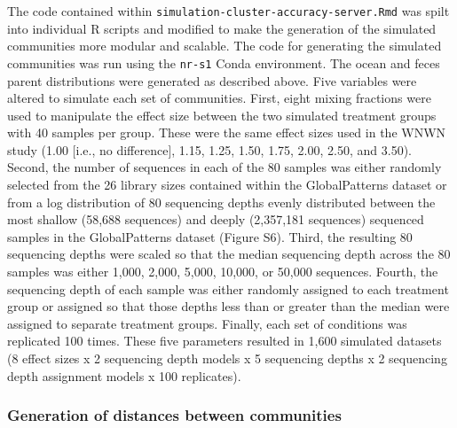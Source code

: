 \documentclass[
]{article}
\begin{document}
The code contained within
\texttt{simulation-cluster-accuracy-server.Rmd} was spilt into
individual R scripts and modified to make the generation of the
simulated communities more modular and scalable. The code for generating
the simulated communities was run using the \texttt{nr-s1} Conda
environment. The ocean and feces parent distributions were generated as
described above. Five variables were altered to simulate each set of
communities. First, eight mixing fractions were used to manipulate the
effect size between the two simulated treatment groups with 40 samples
per group. These were the same effect sizes used in the WNWN study (1.00
{[}i.e., no difference{]}, 1.15, 1.25, 1.50, 1.75, 2.00, 2.50, and
3.50). Second, the number of sequences in each of the 80 samples was
either randomly selected from the 26 library sizes contained within the
GlobalPatterns dataset or from a log distribution of 80 sequencing
depths evenly distributed between the most shallow (58,688 sequences)
and deeply (2,357,181 sequences) sequenced samples in the GlobalPatterns
dataset (Figure S6). Third, the resulting 80 sequencing depths were
scaled so that the median sequencing depth across the 80 samples was
either 1,000, 2,000, 5,000, 10,000, or 50,000 sequences. Fourth, the
sequencing depth of each sample was either randomly assigned to each
treatment group or assigned so that those depths less than or greater
than the median were assigned to separate treatment groups. Finally,
each set of conditions was replicated 100 times. These five parameters
resulted in 1,600 simulated datasets (8 effect sizes x 2 sequencing
depth models x 5 sequencing depths x 2 sequencing depth assignment
models x 100 replicates).

\hypertarget{generation-of-distances-between-communities}{%
\subsubsection{Generation of distances between
communities}\label{generation-of-distances-between-communities}}
\end{document}
